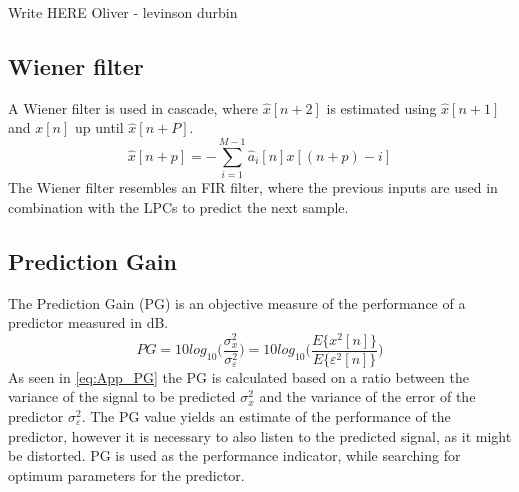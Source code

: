 Write HERE Oliver - levinson durbin\\



\subsection{Wiener filter}
A Wiener filter is used in cascade, where $\hat{x}[n+2]$ is estimated using $\hat{x}[n+1]$ and $x[n]$ up until $\hat{x}[n+P]$. 
\begin{equation}\label{eq:AppPredictor}
\hat{x}[n+p] =- \sum^{M-1}_{i=1}\hat{a}_i[n]x[(n+p)-i]
\end{equation}
The Wiener filter resembles an FIR filter, where the previous inputs are used in combination with the LPCs to predict the next sample. 

\subsection{Prediction Gain}
The Prediction Gain (PG) is an objective measure of the performance of a predictor measured in dB. 
\begin{equation}\label{eq:App_PG}
PG = 10 log_{10}\bigg(\frac{\sigma^2_x}{\sigma^2_\varepsilon}\bigg) = 10 log_{10}\bigg(\frac{E\{x^2[n]\}}{E\{\varepsilon^2[n]\}}\bigg)
\end{equation}
As seen in \autoref{eq:App_PG} the PG is calculated based on a ratio between the variance of the signal to be predicted $\sigma^2_x$ and the variance of the error of the predictor $\sigma^2_\varepsilon$. The PG value yields an estimate of the performance of the predictor, however it is necessary to also listen to the predicted signal, as it might be distorted. PG is used as the performance indicator, while searching for optimum parameters for the predictor.  


%	

%	
